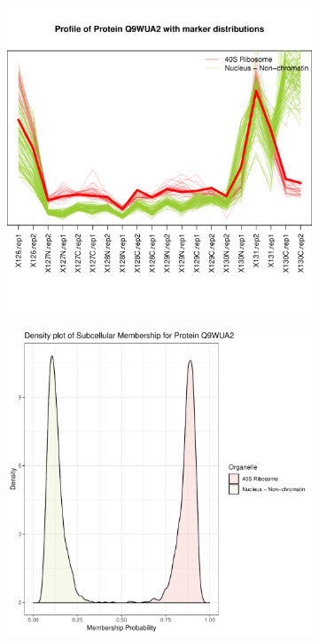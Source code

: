 \documentclass[12pt,english]{article}\usepackage[]{graphicx}\usepackage[]{color}
\makeatletter
\def\maxwidth{ %
  \ifdim\Gin@nat@width>\linewidth
    \linewidth
  \else
    \Gin@nat@width
  \fi
}
\newenvironment{knitrout}{}{} %
\makeatother
\begin{document}
\begin{figure}[h]
\begin{subfigure}[t]{0.5\textwidth}
\begin{knitrout}
{\centering \includegraphics[width=\maxwidth]{figure/Q9WUA2-prof-1} 

}



\end{knitrout}
    \caption{}
  \end{subfigure}
  \vspace{1cm}
  \begin{subfigure}[t]{0.5\textwidth}
    \centering
\begin{knitrout}
\color{fgcolor}

{\centering \includegraphics[width=\maxwidth]{figure/Q9WUA2-dens-1} 

}
\end{knitrout}
\end{subfigure}
\end{figure}
\end{document}
